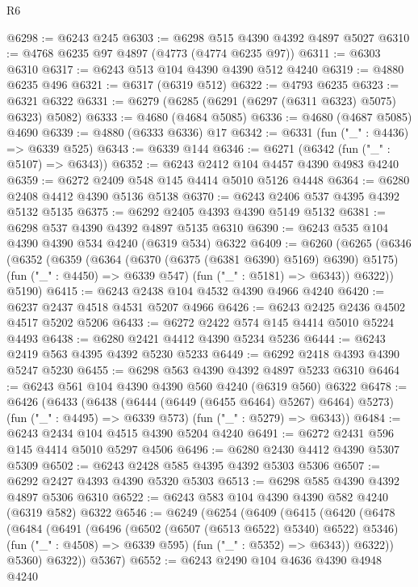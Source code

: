 \begin{lexlean}{R6}
\begin{coremodule}
@6298 := @6243 @245
@6303 := @6298 @515 @4390 @4392 @4897 @5027
@6310 := @4768 @6235 @97 @4897 (@4773 (@4774 @6235 @97))
@6311 := @6303 @6310
@6317 := @6243 @513 @104 @4390 @4390 @512 @4240
@6319 := @4880 @6235 @496
@6321 := @6317 (@6319 @512)
@6322 := @4793 @6235
@6323 := @6321 @6322
@6331 := @6279 (@6285 (@6291 (@6297 (@6311 @6323) @5075) @6323) @5082)
@6333 := @4680 (@4684 @5085)
@6336 := @4680 (@4687 @5085) @4690
@6339 := @4880 (@6333 @6336) @17
@6342 := @6331 (fun ("_" : @4436) => @6339 @525)
@6343 := @6339 @144
@6346 := @6271 (@6342 (fun ("_" : @5107) => @6343))
@6352 := @6243 @2412 @104 @4457 @4390 @4983 @4240
@6359 := @6272 @2409 @548 @145 @4414 @5010 @5126 @4448
@6364 := @6280 @2408 @4412 @4390 @5136 @5138
@6370 := @6243 @2406 @537 @4395 @4392 @5132 @5135
@6375 := @6292 @2405 @4393 @4390 @5149 @5132
@6381 := @6298 @537 @4390 @4392 @4897 @5135 @6310
@6390 := @6243 @535 @104 @4390 @4390 @534 @4240 (@6319 @534) @6322
@6409 := @6260
    (@6265
      (@6346
        (@6352
          (@6359
            (@6364 (@6370 (@6375 (@6381 @6390) @5169) @6390) @5175)
            (fun ("_" : @4450) => @6339 @547)
            (fun ("_" : @5181) => @6343))
          @6322))
      @5190)
@6415 := @6243 @2438 @104 @4532 @4390 @4966 @4240
@6420 := @6237 @2437 @4518 @4531 @5207 @4966
@6426 := @6243 @2425 @2436 @4502 @4517 @5202 @5206
@6433 := @6272 @2422 @574 @145 @4414 @5010 @5224 @4493
@6438 := @6280 @2421 @4412 @4390 @5234 @5236
@6444 := @6243 @2419 @563 @4395 @4392 @5230 @5233
@6449 := @6292 @2418 @4393 @4390 @5247 @5230
@6455 := @6298 @563 @4390 @4392 @4897 @5233 @6310
@6464 := @6243 @561 @104 @4390 @4390 @560 @4240 (@6319 @560) @6322
@6478 := @6426
    (@6433
      (@6438 (@6444 (@6449 (@6455 @6464) @5267) @6464) @5273)
      (fun ("_" : @4495) => @6339 @573)
      (fun ("_" : @5279) => @6343))
@6484 := @6243 @2434 @104 @4515 @4390 @5204 @4240
@6491 := @6272 @2431 @596 @145 @4414 @5010 @5297 @4506
@6496 := @6280 @2430 @4412 @4390 @5307 @5309
@6502 := @6243 @2428 @585 @4395 @4392 @5303 @5306
@6507 := @6292 @2427 @4393 @4390 @5320 @5303
@6513 := @6298 @585 @4390 @4392 @4897 @5306 @6310
@6522 := @6243 @583 @104 @4390 @4390 @582 @4240 (@6319 @582) @6322
@6546 := @6249
    (@6254
      (@6409
        (@6415
          (@6420
            (@6478
              (@6484
                (@6491
                  (@6496 (@6502 (@6507 (@6513 @6522) @5340) @6522) @5346)
                  (fun ("_" : @4508) => @6339 @595)
                  (fun ("_" : @5352) => @6343))
                @6322))
            @5360)
          @6322))
      @5367)
@6552 := @6243 @2490 @104 @4636 @4390 @4948 @4240

\end{coremodule}
\end{lexlean}
